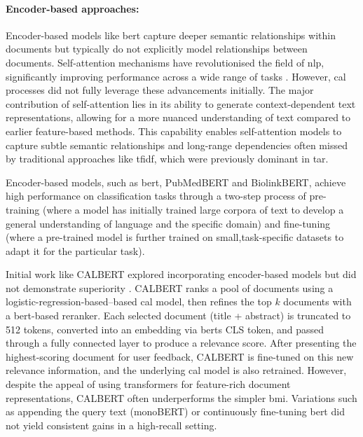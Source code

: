 \documentclass[10pt,oneside]{book}
\begin{document}
\paragraph{Encoder-based approaches:}
Encoder-based models like \gls*{bert} capture deeper semantic relationships within documents but typically do not explicitly model relationships between documents. Self-attention mechanisms have revolutionised the field of \gls*{nlp}, significantly improving performance across a wide range of tasks \cite{vaswani_attention_2023}. However, \gls*{cal} processes did not fully leverage these advancements initially. The major contribution of self-attention lies in its ability to generate context-dependent text representations, allowing for a more nuanced understanding of text compared to earlier feature-based methods. This capability enables self-attention models to capture subtle semantic relationships and long-range dependencies often missed by traditional approaches like \gls*{tfidf}, which were previously dominant in \gls*{tar}.

Encoder-based models, such as \gls*{bert}, PubMedBERT and BiolinkBERT, achieve high performance on classification tasks through a two-step process of pre-training (where a model has initially trained large corpora of text to develop a general understanding of language and the specific domain) and fine-tuning (where a pre-trained model is further trained on small,task-specific datasets to adapt it for the particular task). 

Initial work like CALBERT explored incorporating encoder-based models but did not demonstrate superiority \cite{sadri_continuous_2022}. CALBERT ranks a pool of documents using a logistic-regression-based–based \gls*{cal} model, then refines the top $k$ documents with a \gls*{bert}-based reranker. Each selected document (title + abstract) is truncated to 512 tokens, converted into an embedding via \glspl*{bert}  CLS token, and passed through a fully connected layer to produce a relevance score. After presenting the highest-scoring document for user feedback, CALBERT is fine-tuned on this new relevance information, and the underlying \gls*{cal} model is also retrained. However, despite the appeal of using transformers for feature-rich document representations, CALBERT often underperforms the simpler \gls*{bmi}. Variations such as appending the query text (monoBERT) or continuously fine-tuning \gls*{bert} did not yield consistent gains in a high-recall setting. 
\end{document}
